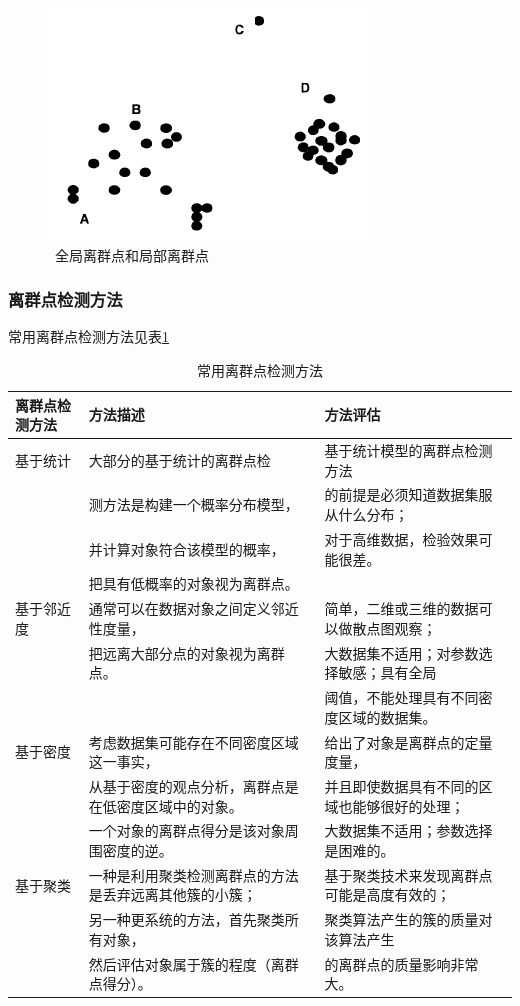 \begin{figure}[thbp!]
\centering
\includegraphics[width=0.4\linewidth]{figure/2-3}
\caption{\ 全局离群点和局部离群点}
\label{fig:2-3}
\end{figure}



\subsubsection{离群点检测方法}

常用离群点检测方法见表\ref{tb:filter1}

\begin{table}[thbp]%
\footnotesize
\caption{常用离群点检测方法}
\begin{center}
\begin{tabular}{|l|l|l|}
\hline  离群点检测方法& 方法描述 & 方法评估  \\ 
\hline 基于统计 & 大部分的基于统计的离群点检& 基于统计模型的离群点检测方法 \\  
&测方法是构建一个概率分布模型， &的前提是必须知道数据集服从什么分布； \\
&并计算对象符合该模型的概率，&对于高维数据，检验效果可能很差。\\
&把具有低概率的对象视为离群点。& \\
\hline 基于邻近度 & 通常可以在数据对象之间定义邻近性度量， & 简单，二维或三维的数据可以做散点图观察；  \\ 
& 把远离大部分点的对象视为离群点。&大数据集不适用；对参数选择敏感；具有全局\\
& & 阈值，不能处理具有不同密度区域的数据集。\\
\hline 基于密度 & 考虑数据集可能存在不同密度区域这一事实， & 给出了对象是离群点的定量度量， \\ 
&从基于密度的观点分析，离群点是在低密度区域中的对象。&并且即使数据具有不同的区域也能够很好的处理；\\
&一个对象的离群点得分是该对象周围密度的逆。&大数据集不适用；参数选择是困难的。\\
\hline 基于聚类 & 一种是利用聚类检测离群点的方法是丢弃远离其他簇的小簇；& 基于聚类技术来发现离群点可能是高度有效的； \\ 
&另一种更系统的方法，首先聚类所有对象，&聚类算法产生的簇的质量对该算法产生\\
&然后评估对象属于簇的程度（离群点得分）。 &的离群点的质量影响非常大。\\
\hline

\end{tabular} 
\end{center}
\label{tb:filter1}%
\end{table}

